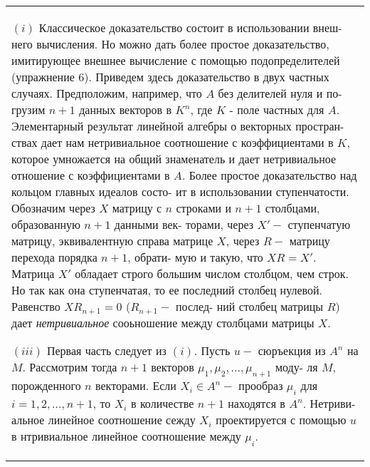 \documentclass{mai_book}
\begin{document}
	\begin{tabular}{|p{13cm}}
	\noindent
	$(i)$ Классическое доказательство состоит в использовании внеш-\linebreak
	него вычисления. Но можно дать более простое доказательство,\linebreak
	имитирующее внешнее вычисление с помощью подопределителей\linebreak
	(упражнение 6). Приведем здесь доказательство в двух частных\linebreak
	случаях. Предположим, например, что $A$ без делителей нуля и по-\linebreak
	грузим $n + 1$ данных векторов в $K^n$, где $K$ - поле частных для $A$.\linebreak
	Элементарный результат линейной алгебры о векторных простран-\linebreak
	ствах дает нам нетривиальное соотношение с коэффициентами в $K$,\linebreak
	которое умножается на общий знаменатель и дает нетривиальное\linebreak
	отношение с коэффициентами в $A$.\newline
	Более простое доказательство над кольцом главных идеалов состо-\linebreak
	ит в использовании ступенчатости. Обозначим через $X$ матрицу с\linebreak
	$n$ строками и $n + 1$ столбцами, образованную $n + 1$ данными век-\linebreak
	торами, через $X' -$ ступенчатую матрицу, эквивалентную справа\linebreak
	матрице $X$, через $R -$ матрицу перехода порядка $n + 1$, обрати-\linebreak
	мую и такую, что $XR = X'$. Матрица $X'$ обладает строго большим\linebreak
	числом столбцом, чем строк. Но так как она ступенчатая, то ее\linebreak
	последний столбец нулевой. Равенство $XR_{n + 1} = 0$ ($R_{n + 1} -$ послед-\linebreak
	ний столбец матрицы $R$) дает {\it нетривиальное} сооьношение между\linebreak
	столбцами матрицы $X$.
	
	$(iii)$ Первая часть следует из $(i)$. Пусть $u -$ сюръекция из $A^n$\linebreak
	на $M$. Рассмотрим тогда $n + 1$ векторов $\mu_1, \mu_2, \ldots, \mu_{n + 1}$ моду-\linebreak
	ля $M$, порожденного $n$ векторами. Если $X_i \in A^n - $ прообраз $\mu_i$ для\linebreak
	$i = 1, 2, \ldots, n + 1$, то $X_i$ в количестве $n + 1$ находятся в $A^n$. Нетриви-\linebreak
	альное линейное соотношение сежду $X_i$ проектируется с помощью\linebreak
	$u$ в нтривиальное линейное соотношение между $\mu_i$.\linebreak
	

\end{tabular}
\end{document}
